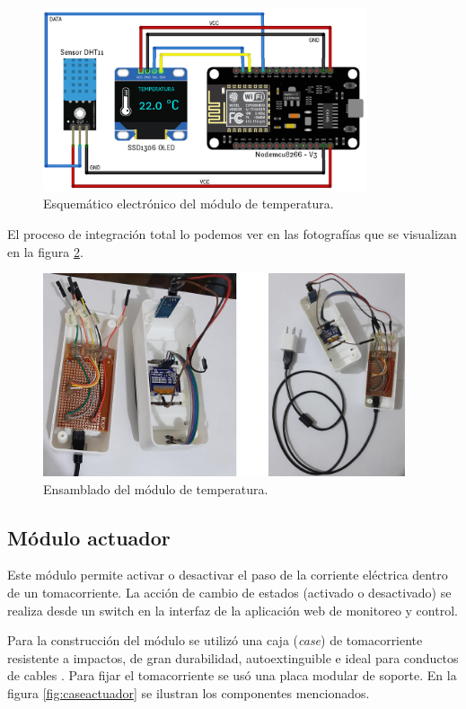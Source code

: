 \begin{figure}[htpb]
\centering 
\includegraphics[width=0.85\textwidth]{./Figures/ci-temp.png}
\caption{Esquemático electrónico del módulo de temperatura. }
\label{fig:citemp}
\end{figure}

El proceso de integración total lo podemos ver en las fotografías que se visualizan en la figura \ref{fig:entemp}.

\begin{figure}[htpb]
\centering 
\includegraphics[width=0.95\textwidth]{./Figures/temperatura.jpg}
\caption{Ensamblado del módulo de temperatura. }
\label{fig:entemp}
\end{figure}

\subsection{Módulo actuador}

Este módulo permite activar o desactivar el paso de la corriente eléctrica dentro de un tomacorriente. La acción de cambio de estados (activado o desactivado) se realiza desde un switch en la interfaz de la aplicación web de monitoreo y control.

Para la construcción del módulo se utilizó una caja (\emph{case}) de tomacorriente  resistente a impactos, de gran durabilidad, autoextinguible e ideal para conductos de cables \citep{WEBSITE:18}. Para fijar el tomacorriente se usó una placa modular de soporte. En la figura \ref{fig:caseactuador} se ilustran los componentes mencionados.

